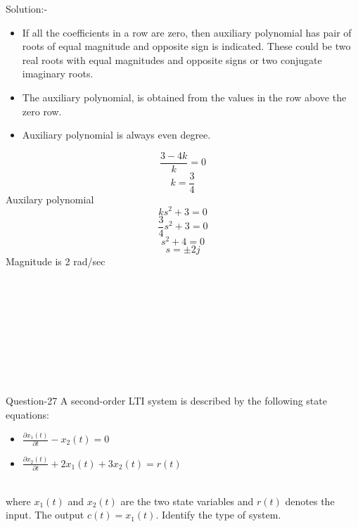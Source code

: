 \documentclass[journal,12pt,twocolumn]{IEEEtran}
\begin{document}
\begin{frame}{Solution:- }
\begin{frame}{}
\begin{itemize}
   \item If all the coefficients in a row are zero, then auxiliary polynomial has pair of roots of equal magnitude and opposite sign is indicated. These could be two real roots with equal magnitudes and opposite signs or two conjugate imaginary roots.
   \item The auxiliary polynomial, is obtained from the values in the row above the zero row.
   \item Auxiliary polynomial is always even degree.
\end{itemize}

\end{frame}
\begin{frame}{}
\begin{centre}

$$
\frac{3 - 4k}{k} = 0
$$
$$ k = \frac{3}{4}$$
Auxilary polynomial\\
$$
 ks^2 +3 = 0
$$
$$
 \frac{3}{4}s^2 +3 = 0
$$
$$
 s^2 + 4 =0 
$$
$$  s = \pm 2j$$
Magnitude is 2 rad/sec 

\\\\\\\
\end{centre}
    
\end{frame}
\\\\\\
\begin{frame}{Question-27 }
A second-order LTI system is described by the following state equations: 
\begin{itemize}
    \item $\frac{\partial x_1(t)}{\partial t} - x_2(t) = 0$
    \item $\frac{\partial x_2(t)}{\partial t} + 2x_1(t) + 3x_2(t) = r(t)$
\end{itemize}
\\where $x_1(t)$ and $x_2(t)$ are the two state variables and $r(t)$ denotes the input. The output $c(t) = x_1(t)$. Identify the type of system.
\end{frame}


\end{frame}
\end{document}
